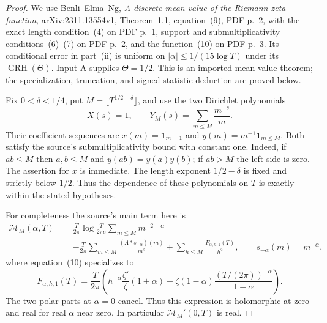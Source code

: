 \begin{proof}
We use Benli--Elma--Ng, \emph{A discrete mean value of the
Riemann zeta function}, arXiv:2311.13554v1, Theorem~1.1,
equation~(9), PDF p.~2, with the exact length condition~(4)
on PDF p.~1, support and submultiplicativity conditions~(6)--(7)
on PDF p.~2, and the function~(10) on PDF p.~3.
Its conditional error in part~(ii) is uniform on
$|\alpha|\le1/(15\log T)$ under its
$\operatorname{GRH}(\Theta)$. Input A supplies
$\Theta=1/2$. This is an imported mean-value theorem; the
specialization, truncation, and signed-statistic deduction are
proved below.

Fix $0<\delta<1/4$, put
$M=\lfloor T^{1/2-\delta}\rfloor$, and use the two
Dirichlet polynomials
\[
 X(s)=1,\qquad
 Y_M(s)=\sum_{m\le M}\frac{m^{-s}}m.
\]
Their coefficient sequences are
$x(m)=\mathbf1_{m=1}$ and
$y(m)=m^{-1}\mathbf1_{m\le M}$. Both satisfy the source's
submultiplicativity bound with constant one. Indeed, if
$ab\le M$ then $a,b\le M$ and $y(ab)=y(a)y(b)$;
if $ab>M$ the left side is zero. The assertion for $x$
is immediate. The length exponent $1/2-\delta$ is fixed
and strictly below $1/2$. Thus the dependence of these
polynomials on $T$ is exactly within the stated hypotheses.

For completeness the source's main term here is
\begin{align*}
 \mathcal M_M(\alpha,T)
  ={}&\frac{T}{2\pi}\log\frac{T}{2\pi e}
                    \sum_{m\le M}m^{-2-\alpha}\\
   &-\frac{T}{2\pi}\sum_{m\le M}
              \frac{(\Lambda*s_{-\alpha})(m)}{m^2}
      +\sum_{h\le M}\frac{F_{\alpha,h,1}(T)}{h^2},
 \qquad s_{-\alpha}(m)=m^{-\alpha},
\end{align*}
where equation~(10) specializes to
\[
 F_{\alpha,h,1}(T)=\frac{T}{2\pi}
  \left(
   h^{-\alpha}\frac{\zeta'}{\zeta}(1+\alpha)
   -\zeta(1-\alpha)\frac{(T/(2\pi))^{-\alpha}}{1-\alpha}
  \right).
\]
The two polar parts at $\alpha=0$ cancel. Thus this expression
is holomorphic at zero and real for real $\alpha$ near zero.
In particular $\mathcal M_M'(0,T)$ is real.


\end{proof}
